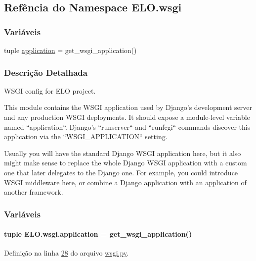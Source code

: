 \hypertarget{namespaceELO_1_1wsgi}{\subsection{Refência do Namespace E\-L\-O.\-wsgi}
\label{namespaceELO_1_1wsgi}
}
\subsubsection*{Variáveis}
\begin{DoxyCompactItemize}
\item 
tuple \hyperlink{namespaceELO_1_1wsgi_a8951c4ea2920440aeeb73c65ab517a5d}{application} = get\-\_\-wsgi\-\_\-application()
\end{DoxyCompactItemize}


\subsubsection{Descrição Detalhada}
\begin{DoxyVerb}WSGI config for ELO project.

This module contains the WSGI application used by Django's development server
and any production WSGI deployments. It should expose a module-level variable
named ``application``. Django's ``runserver`` and ``runfcgi`` commands discover
this application via the ``WSGI_APPLICATION`` setting.

Usually you will have the standard Django WSGI application here, but it also
might make sense to replace the whole Django WSGI application with a custom one
that later delegates to the Django one. For example, you could introduce WSGI
middleware here, or combine a Django application with an application of another
framework.\end{DoxyVerb}
 

\subsubsection{Variáveis}
\hypertarget{namespaceELO_1_1wsgi_a8951c4ea2920440aeeb73c65ab517a5d}{
\paragraph[{application}]{\setlength{\rightskip}{0pt plus 5cm}tuple E\-L\-O.\-wsgi.\-application = get\-\_\-wsgi\-\_\-application()}}\label{namespaceELO_1_1wsgi_a8951c4ea2920440aeeb73c65ab517a5d}


Definição na linha \hyperlink{wsgi_8py_source_l00028}{28} do arquivo \hyperlink{wsgi_8py_source}{wsgi.\-py}.

